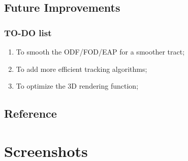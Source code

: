 \documentclass[letterpaper,10pt,english]{sphinxmanual}
\begin{document}
\subsection{Future Improvements}
\label{todo::doc}\label{todo:future-improvements}

\subsubsection{TO-DO list}
\label{todo:to-do-list}\begin{enumerate}
\item {} 
To smooth the ODF/FOD/EAP for a smoother tract;

\item {} 
To add more efficient tracking algorithms;

\item {} 
To optimize the 3D rendering function;

\end{enumerate}


\subsection{Reference}
\label{reference::doc}\label{reference:reference}

\section{Screenshots}
\label{screenshot:screenshots}\label{screenshot::doc}
\end{document}
